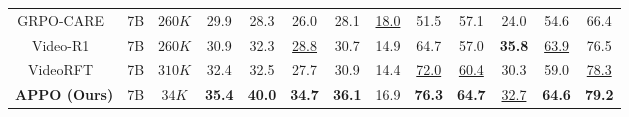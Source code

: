 \begin{table}[!t]
{\begin{tabular}{c|c|c|cccc|cc|c|c|c|c}
GRPO-CARE~\cite{grpogrpo} & 7B & $260K$ & 29.9 & 28.3 & 26.0 & 28.1 & \underline{18.0} & 51.5 & 57.1 & 24.0 & 54.6 &  66.4 \\
Video-R1~\cite{feng2025video} & 7B & $260K$ & 30.9 & 32.3 & \underline{28.8} & 30.7 & 14.9 & 64.7 & 57.0 & \textbf{35.8} & \underline{63.9} & 76.5 \\
VideoRFT~\cite{wang2025videorft} & 7B & $310K$ & 32.4 & 32.5 & 27.7 & 30.9 & 14.4 & \underline{72.0} & \underline{60.4} & 30.3 & 59.0 & \underline{78.3} \\
\midrule
\rowcolor{ModelGreen}\textbf{APPO (Ours)} & 7B & $34K$ & \textbf{35.4} & \textbf{40.0} & \textbf{34.7} & \textbf{36.1} & 16.9 & \textbf{76.3} & \textbf{64.7} & \underline{32.7} & \textbf{64.6} & \textbf{79.2} \\
\bottomrule
\end{tabular}
}
\vspace{-0.5em}
\label{tab:comp}
\end{table}

